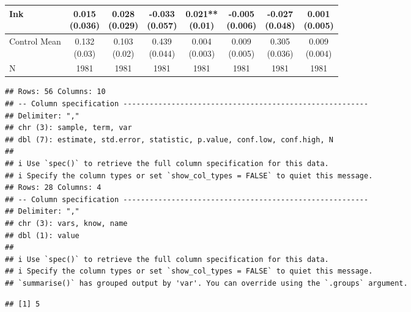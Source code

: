 \documentclass[
]{article}
\begin{document}
\begin{table}
{\begin{tabular}[t]{lccccccc}
\hspace{1em}Ink & \makecell[c]{0.015\\(0.036)} & \makecell[c]{0.028\\(0.029)} & \makecell[c]{-0.033\\(0.057)} & \makecell[c]{0.021**\\(0.01)} & \makecell[c]{-0.005\\(0.006)} & \makecell[c]{-0.027\\(0.048)} & \makecell[c]{0.001\\(0.005)}\\
\midrule
\hspace{1em}Control Mean & \makecell[c]{0.132\\(0.03)} & \makecell[c]{0.103\\(0.02)} & \makecell[c]{0.439\\(0.044)} & \makecell[c]{0.004\\(0.003)} & \makecell[c]{0.009\\(0.005)} & \makecell[c]{0.305\\(0.036)} & \makecell[c]{0.009\\(0.004)}\\
\hspace{1em}N & 1981 & 1981 & 1981 & 1981 & 1981 & 1981 & 1981\\
\bottomrule
\end{tabular}}
\end{table}

\begin{verbatim}
## Rows: 56 Columns: 10
## -- Column specification --------------------------------------------------------
## Delimiter: ","
## chr (3): sample, term, var
## dbl (7): estimate, std.error, statistic, p.value, conf.low, conf.high, N
## 
## i Use `spec()` to retrieve the full column specification for this data.
## i Specify the column types or set `show_col_types = FALSE` to quiet this message.
## Rows: 28 Columns: 4
## -- Column specification --------------------------------------------------------
## Delimiter: ","
## chr (3): vars, know, name
## dbl (1): value
## 
## i Use `spec()` to retrieve the full column specification for this data.
## i Specify the column types or set `show_col_types = FALSE` to quiet this message.
## `summarise()` has grouped output by 'var'. You can override using the `.groups` argument.
\end{verbatim}

\begin{verbatim}
## [1] 5
\end{verbatim}
\end{document}
